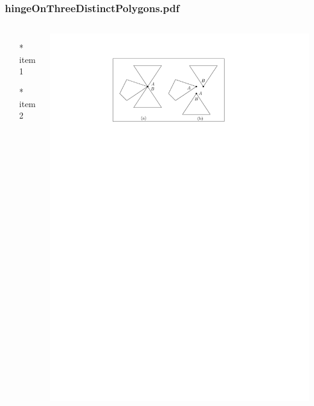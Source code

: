 \begin{frame} \frametitle{hingeOnThreeDistinctPolygons.pdf}
    \begin{columns}[c]
        \begin{itemize}
            \item[*] item 1
            \item[*] item 2
        \end{itemize}
        \begin{minipage}{\linewidth}
            \begin{center}
            \includegraphics[width=.9\textwidth]{graphics/hingeOnThreeDistinctPolygons.pdf}
            \label{gfx:hingeOnThreeDistinctPolygons.pdf}
            \end{center}
        \end{minipage}
    \end{columns}
\end{frame}

